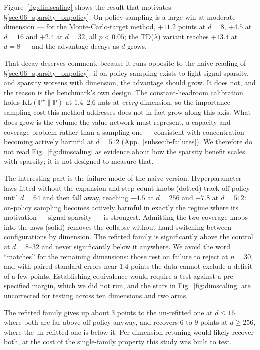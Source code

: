 Figure~\ref{fig:dimscaling} shows the result that motivates
\S\ref{sec:06_sparsity_onpolicy}. On-policy sampling is a large win at moderate
dimension --- for the Monte-Carlo-target method, $+11.2$ points at $d=8$,
$+4.5$ at $d=16$ and $+2.4$ at $d=32$, all $p<0.05$; the TD($\lambda$) variant
reaches $+13.4$ at $d=8$ --- and the advantage decays as $d$ grows.

That decay deserves comment, because it runs opposite to the naive reading of
\S\ref{sec:06_sparsity_onpolicy}: if on-policy sampling exists to fight signal
sparsity, and sparsity worsens with dimension, the advantage should grow. It
does not, and the reason is the benchmark's own design. The constant-headroom
calibration holds $\mathrm{KL}(\mathbb{P}^{\star}\|\mathbb{P})$ at $1.4$--$2.6$
nats at \emph{every} dimension, so the importance-sampling cost this method
addresses does not in fact grow along this axis. What does grow is the volume
the value network must represent, a capacity and coverage problem rather than a
sampling one --- consistent with concentration becoming actively harmful at
$d=512$ (App.~\ref{subsec:b-failures}). We therefore do not read
Fig.~\ref{fig:dimscaling} as evidence about how the sparsity benefit scales
with sparsity; it is not designed to measure that.

The interesting part is the failure mode of the naive version. Hyperparameter
laws fitted without the expansion and step-count knobs (dotted) track
off-policy until $d=64$ and then fall away, reaching $-4.5$ at $d=256$ and
$-7.8$ at $d=512$: on-policy sampling becomes actively harmful in exactly the
regime where its motivation --- signal sparsity --- is strongest. Admitting the
two coverage knobs into the laws (solid) removes the collapse without
hand-switching between configurations by dimension. The refitted family is
significantly above the control at $d=8$--$32$ and never significantly below
it anywhere. We avoid the word ``matches'' for the remaining dimensions: those
rest on failure to reject at $n=30$, and with paired standard errors near
$1.4$ points the data cannot exclude a deficit of a few points. Establishing
equivalence would require a test against a pre-specified margin, which we did
not run, and the stars in Fig.~\ref{fig:dimscaling} are uncorrected for
testing across ten dimensions and two arms.

The refitted family gives up about $3$ points to the un-refitted one at $d\le16$, where both are far above off-policy anyway,
and recovers $6$ to $9$ points at $d\ge256$, where the un-refitted one is below
it. Per-dimension retuning would likely recover both, at the cost of the
single-family property this study was built to test.
